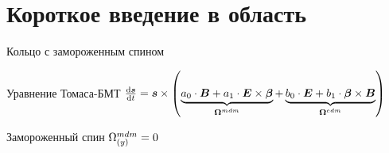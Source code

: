 \documentclass[14pt]{beamer}
\newcommand{\Wedm}{\W^{edm}}
\newcommand{\Wmdm}{\W^{mdm}}
\begin{document}
\section{Короткое введение в область}

\begin{frame}{Кольцо с замороженным спином}
\begin{block}{Уравнение Томаса-БМТ}
	$\frac{\rd \vec s}{\rd t} = \vec s \times \bkt{\underbrace{a_0\cdot\vec B + a_1\cdot\vec E\times\vec\beta}_{\vec\Wmdm} + \underbrace{b_0\cdot\vec E + b_1\cdot\vec\beta\times\vec B}_{\vec\Wedm}}$
\end{block}
\begin{block}{Замороженный спин}
	$\Wmdm_{(y)} = 0$
\end{block}
\end{frame}
\end{document}
